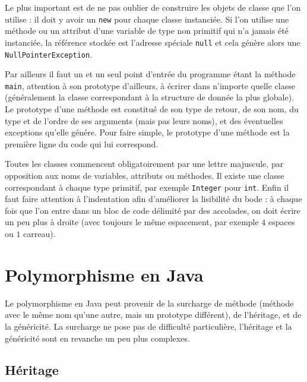 \documentclass[10pt]{article}
\begin{document}
Le plus important est de ne pas oublier de construire les objets de classe
que l'on utilise : il doit y avoir un \texttt{new} pour chaque classe instanciée.
Si l'on utilise une méthode ou un attribut d'une variable de type non primitif
qui n'a jamais été instanciée, la référence stockée est l'adresse spéciale \texttt{null}
et cela génère alors une \texttt{NullPointerException}.

Par ailleurs il faut un et un seul point d'entrée du programme étant la méthode \texttt{main},
attention à son prototype d'ailleurs,
à écrirer dans n'importe quelle classe (généralement la classe correspondant à la structure
de donnée la plus globale). Le prototype d'une méthode est constitué de son type de retour,
de son nom, du type et de l'ordre de ses arguments (mais pas leurs noms), et des éventuelles exceptions
qu'elle génére. Pour faire simple, le prototype d'une méthode est la première ligne du code qui lui correspond.

Toutes les classes commencent obligatoirement par une lettre majuscule,
par opposition aux noms de variables, attributs ou méthodes. Il existe une classe correspondant à chaque type primitif, par exemple
\texttt{Integer} pour \texttt{int}. Enfin il faut faire attention à l'indentation afin d'améliorer la lisibilité du bode :
à chaque fois que l'on entre dans un bloc de code délimité par des accolades, on doit écrire un peu plus à droite (avec toujours
le même espacement, par exemple $4$ espaces ou $1$ carreau).


\section{Polymorphisme en Java}
\label{sec.heritage}

Le polymorphisme en Java peut provenir de la surcharge de méthode (méthode avec le même nom qu'une autre, mais un prototype différent),
de l'héritage, et de la généricité. La surcharge ne pose pas de difficulté particulière, l'héritage et la généricité sont en revanche un
peu plus complexes.

\subsection{Héritage}
\end{document}
